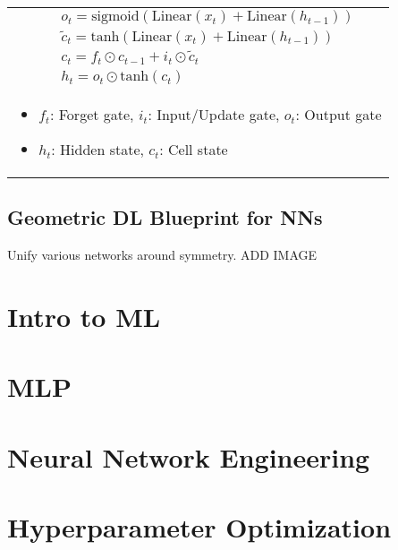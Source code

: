 \documentclass{article}
\begin{document}
\begin{summary}
\begin{center}
\begin{tabular}{llll}
            & & & $o_t = \text{sigmoid}(\text{Linear}(x_t) + \text{Linear}(h_{t-1}))$ \\
            & & & $\tilde{c}_t = \text{tanh}(\text{Linear}(x_t) + \text{Linear}(h_{t-1}))$ \\
            & & & $c_t = f_t \odot c_{t-1} + i_t \odot \tilde{c}_t$ \\
            & & & $h_t = o_t \odot \text{tanh}(c_t)$ \\
            \multicolumn{4}{p{\linewidth}}{
            \begin{itemize}
                \item $f_t$: Forget gate, $i_t$: Input/Update gate, $o_t$: Output gate
                \item $h_t$: Hidden state, $c_t$: Cell state
            \end{itemize}} \\
            \bottomrule
        \end{tabular}
    \end{center}
\end{summary}

\subsection{Geometric DL Blueprint for NNs}
\begin{summary}
    Unify various networks around symmetry. 
    ADD IMAGE
\end{summary}
\newpage

\section{Intro to ML}
% 
\newpage

\section{MLP}

\newpage

\section{Neural Network Engineering}
% 
\newpage

\section{Hyperparameter Optimization}

\newpage
\end{document}
